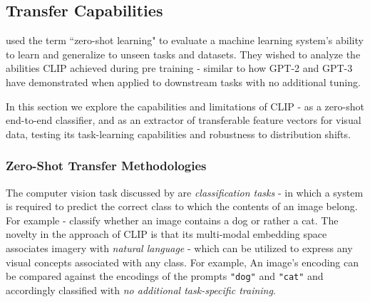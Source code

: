 \documentclass{article}
\begin{document}

\subsection{Transfer Capabilities}
\label{sec:clip-transfer}

\citet{radford2021clip} used the term ``zero-shot learning" to evaluate a machine learning system's ability to learn and generalize to unseen tasks and datasets. They wished to analyze the abilities CLIP achieved during pre training - similar to how GPT-2 and GPT-3 have demonstrated when applied to downstream tasks with no additional tuning.

\medskip
\noindent
In this section we explore the capabilities and limitations of CLIP - as a zero-shot end-to-end classifier, and as an extractor of transferable feature vectors for visual data, testing its task-learning capabilities and robustness to distribution shifts.



\subsubsection{Zero-Shot Transfer Methodologies}
\label{subsec:clip-zs-methods}

The computer vision task discussed by \citet{radford2021clip} are \emph{classification tasks} - in which a system is required to predict the correct class to which the contents of an image belong. For example - classify whether an image contains a dog or rather a cat. The novelty in the approach of CLIP is that its multi-modal embedding space associates imagery with \emph{natural language} - which can be utilized to express any visual concepts associated with any class. For example, An image's encoding can be compared against the encodings of the prompts \texttt{"dog"} and \texttt{"cat"} and accordingly classified with \emph{no additional task-specific training}.
\end{document}
